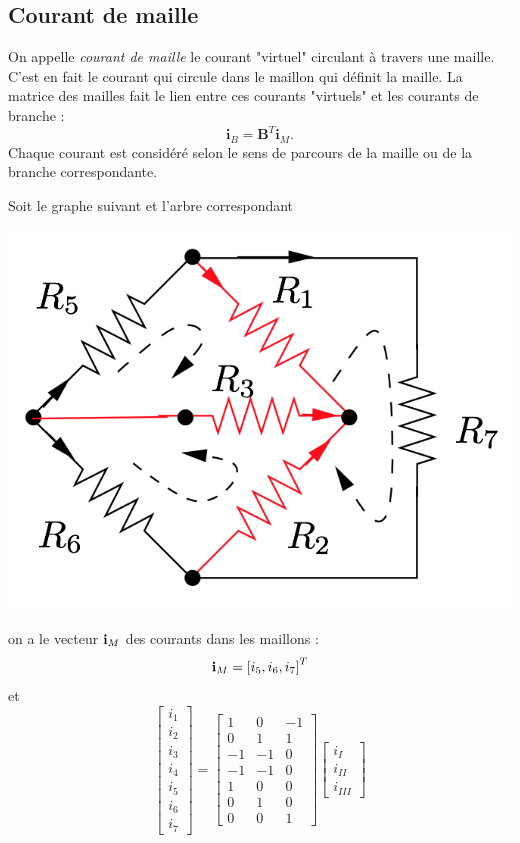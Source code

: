 \subsection{Courant de maille}
On appelle \textit{courant de maille} le courant "virtuel" circulant à travers une maille. C'est en fait le courant qui circule dans le maillon qui définit la maille.  La matrice des mailles fait le lien entre ces courants "virtuels" et les courants de branche : 
$$\mathbf{i}_B = \mathbf{B}^T \mathbf{i}_{M}.$$
Chaque courant est considéré selon le sens de parcours de la maille ou de la branche correspondante.
\begin{testexample}
	Soit le graphe suivant et l'arbre correspondant
	\begin{center}
	\includegraphics[width=0.4\linewidth]{figs/methodes-generales/m_mailles_4}
	\end{center}
	on a le vecteur ${\bf i}_M$ des courants dans les maillons : 
	$${\bf i}_M=\left[ i_5, i_6, i_7\right]^T$$
	et
	$$
		\left[\begin{array}{c}
		i_1 \\
		i_2 \\
		i_3 \\
		i_4 \\
		i_5 \\
		i_6 \\
		i_7 
		\end{array}\right] = 
		\left[\begin{array}{rrr}
		1 & 0 & -1 \\
		0 & 1 & 1 \\
		-1 & -1 & 0 \\
		-1 & -1 & 0 \\
		1 & 0 & 0  \\
		0 & 1 & 0 \\
		0 & 0 & 1 
		\end{array}\right]
		\left[\begin{array}{c}
		i_{I}\\
		i_{II}\\
		i_{III}
		\end{array}\right]$$	
\end{testexample}

